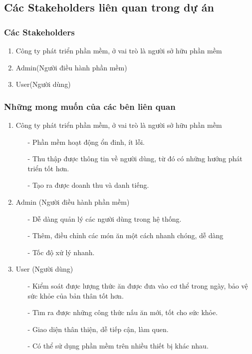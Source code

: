 \subsection{Các Stakeholders liên quan trong dự án}
    \subsubsection{Các Stakeholders}
        \begin{enumerate}
            \item Công ty phát triển phần mềm, ở vai trò là người sở hữu phần mềm
            \item Admin(Người điều hành phần mềm)
            \item User(Người dùng)
        \end{enumerate}
    \subsubsection{Những mong muốn của các bên liên quan}
        \begin{enumerate}
            \item Công ty phát triển phần mềm, ở vai trò là người sở hữu phần mềm
                \begin{itemize}
                    \item [-] Phần mềm hoạt động ổn đinh, ít lỗi.
                    \item [-] Thu thập được thông tin về người dùng, từ đó có những hướng phát triển tốt hơn.
                    \item [-] Tạo ra được doanh thu và danh tiếng.
                \end{itemize}
            
            \item Admin (Người điều hành phần mềm)
                \begin{itemize}
                    \item[-] Dễ dàng quản lý các người dùng trong hệ thống.
                    \item[-] Thêm, điều chỉnh các món ăn một cách nhanh chóng, dễ dàng
                    \item[-] Tốc độ xử lý nhanh.
                \end{itemize}
            
            \item User (Người dùng)
                \begin{itemize}
                    \item[-] Kiểm soát được lượng thức ăn được đưa vào cơ thể trong ngày, bảo vệ sức khỏe của bản thân tốt hơn.
                    \item[-] Tìm ra được những công thức nấu ăn mới, tốt cho sức khỏe.
                    \item[-] Giao diện thân thiện, dễ tiếp cận, làm quen.
                    \item[-] Có thể sử dụng phần mềm trên nhiều thiết bị khác nhau.
                \end{itemize}   
        \end{enumerate}